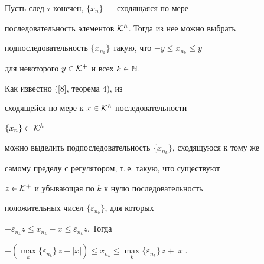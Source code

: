 




\begin{lem}


Пусть след $\tau $ конечен, $\{x_n\}$ --- сходящаяся по мере 


последовательность элементов ${\cal K}^h$. Тогда из нее можно выбрать 


подпоследовательность $\{x_{n_k}\}$ такую, что $-y \le x_{n_k} \le y$ 


для некоторого $y \in {\cal K}^+$ и всех $k \in \Bbb N$.


\end{lem}





\begin{pf}


Как известно ([8], теорема 4), из 


сходящейся по мере к $x \in {\cal K}^h$ последовательности 


$\{x_n\} \subset {\cal K}^h$ 


можно выделить подпоследовательность $\{x_{n_k}\}$, сходящуюся к тому же 


самому пределу с регулятором, т.\,е. такую, что существуют 


$z \in {\cal K}^+$ и убывающая по $k$ к нулю последовательность 


положительных чисел $\{\varepsilon_{n_k}\}$, для которых 


$- \varepsilon_{n_k} z \le x_{n_k} - x \le \varepsilon_{n_k} z$. Тогда 


$-( \max \limits_k \{\varepsilon_{n_k}\} \, z + |x| ) \le x_{n_k} \le 


\max \limits_k \{\varepsilon_{n_k}\} \, z + |x|$. 


\end{pf}





